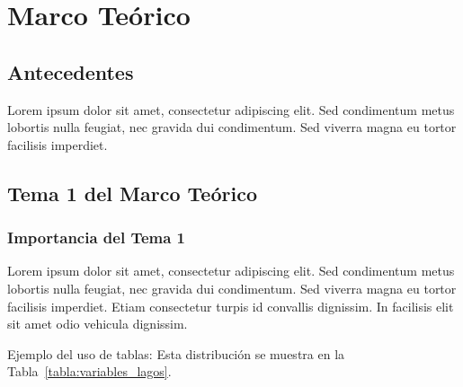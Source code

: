 \chapter{Marco Teórico}
\doublespacing %
\raggedbottom %
\section{Antecedentes}

Lorem ipsum dolor sit amet, consectetur adipiscing elit. Sed condimentum metus lobortis nulla feugiat, nec gravida dui condimentum. Sed viverra magna eu tortor facilisis imperdiet.

\section{Tema 1 del Marco Teórico}

\subsection{Importancia del Tema 1}

Lorem ipsum dolor sit amet, consectetur adipiscing elit. Sed condimentum metus lobortis nulla feugiat, nec gravida dui condimentum. Sed viverra magna eu tortor facilisis imperdiet. Etiam consectetur turpis id convallis dignissim. In facilisis elit sit amet odio vehicula dignissim.

Ejemplo del uso de tablas: Esta distribución se muestra en la Tabla~\ref{tabla:variables_lagos}.

